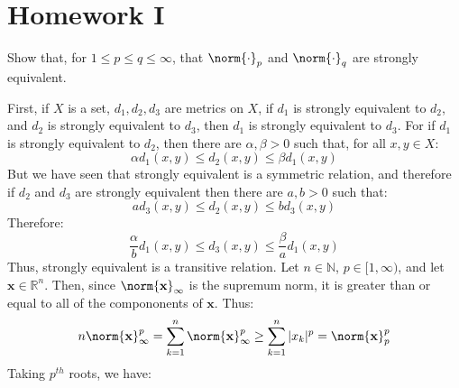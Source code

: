 \documentclass[crop=false,class=book,oneside]{standalone}                      %
\begin{document}
    \section{Homework I}
        \begin{problem}
            Show that, for $1\leq{p}\leq{q}\leq\infty$, that
            $\norm{\cdot}_{p}$ and $\norm{\cdot}_{q}$ are strongly
            equivalent.
        \end{problem}
        \begin{solution}[1]
            First, if $X$ is a set, $d_{1},d_{2},d_{3}$ are
            metrics on $X$, if $d_{1}$ is strongly equivalent to
            $d_{2}$, and $d_{2}$ is strongly equivalent to $d_{3}$,
            then $d_{1}$ is strongly equivalent to $d_{3}$.
            For if $d_{1}$ is strongly equivalent to $d_{2}$, then
            there are $\alpha,\beta>0$ such that, for all
            $x,y\in{X}$:
            \begin{equation}
                \alpha{d}_{1}(x,y)\leq{d}_{2}(x,y)
                \leq\beta{d}_{1}(x,y)
            \end{equation}
            But we have seen that strongly equivalent is a symmetric
            relation, and therefore if $d_{2}$ and $d_{3}$ are
            strongly equivalent then there are $a,b>0$ such that:
            \begin{equation}
                ad_{3}(x,y)\leq{d}_{2}(x,y)\leq{b}d_{3}(x,y)
            \end{equation}
            Therefore:
            \begin{equation}
                \frac{\alpha}{b}d_{1}(x,y)\leq{d}_{3}(x,y)
                \leq\frac{\beta}{a}d_{1}(x,y)
            \end{equation}
            Thus, strongly equivalent is a transitive relation.
            Let $n\in\mathbb{N}$, $p\in[1,\infty)$, and let
            $\mathbf{x}\in\mathbb{R}^{n}$. Then, since
            $\norm{\mathbf{x}}_{\infty}$ is the supremum norm,
            it is greater than or equal to all of the compononents
            of $\mathbf{x}$. Thus:
            \begin{equation}
                n\norm{\mathbf{x}}_{\infty}^{p}=
                \sum_{k=1}^{n}\norm{\mathbf{x}}_{\infty}^{p}
                \geq\sum_{k=1}^{n}|x_{k}|^{p}
                =\norm{\mathbf{x}}_{p}^{p}
            \end{equation}
            Taking $p^{th}$ roots, we have:
            \begin{equation}

\end{equation}
\end{solution}
\end{document}
